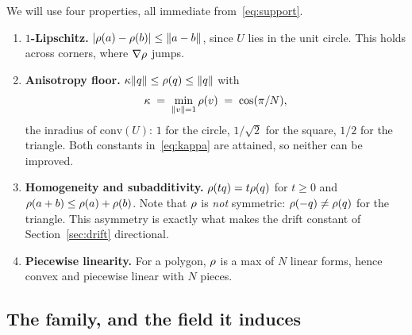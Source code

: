 We will use four properties, all immediate from~\eqref{eq:support}.

\begin{enumerate}
  \item[(P1)] \textbf{$1$-Lipschitz.} $|\rho(a)-\rho(b)| \le \lVert a-b\rVert$,
  since $U$ lies in the unit circle. This holds across corners, where $\nabla\rho$
  jumps.
  \item[(P2)] \textbf{Anisotropy floor.}
  $\kappa\lVert q\rVert \le \rho(q) \le \lVert q\rVert$ with
  \begin{equation}
    \kappa \;=\; \min_{\lVert v\rVert=1}\rho(v) \;=\; \cos(\pi/N),
    \label{eq:kappa}
  \end{equation}
  the inradius of $\mathrm{conv}(U)$: $1$ for the circle, $1/\sqrt2$ for the
  square, $1/2$ for the triangle. Both constants in~\eqref{eq:kappa} are attained,
  so neither can be improved.
  \item[(P3)] \textbf{Homogeneity and subadditivity.} $\rho(tq)=t\rho(q)$ for
  $t\ge0$ and $\rho(a+b)\le\rho(a)+\rho(b)$. Note that $\rho$ is \emph{not}
  symmetric: $\rho(-q)\neq\rho(q)$ for the triangle. This asymmetry is exactly
  what makes the drift constant of Section~\ref{sec:drift} directional.
  \item[(P4)] \textbf{Piecewise linearity.} For a polygon, $\rho$ is a max of $N$
  linear forms, hence convex and piecewise linear with $N$ pieces.
\end{enumerate}

\subsection{The family, and the field it induces}

